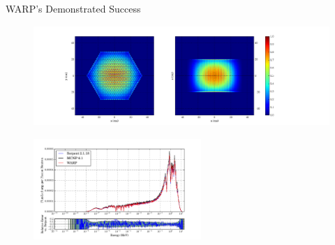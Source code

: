 \documentclass[xcolor=x11names,compress]{beamer}
\renewcommand{\(}{\begin{columns}}
\renewcommand{\)}{\end{columns}}
\newcommand{\<}[1]{\begin{column}{#1}}
\renewcommand{\>}{\end{column}}
\begin{document}
\begin{frame}{WARP's Demonstrated Success}
 
    \begin{center}
 	\begin{figure}     
 	\includegraphics[height=1.5in,clip]{../figs/assembly-fiss-6}
 	\end{figure}
 	\end{center}   
 	
 	\begin{center}
 	\begin{figure}     
 	\includegraphics[height=1.5in,clip]{../figs/assembly-spec-6}
 	\end{figure}
 	\end{center} 
 
\end{frame}
\end{document}

